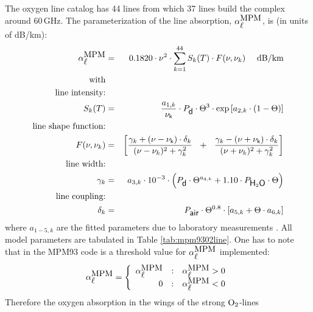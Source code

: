 {
\label{levele:mpm93_o2lines}
The oxygen line catalog has 44 lines from which 37 lines build the 
complex around 60\,GHz. The parameterization of the line absorption,
$\alpha^{\mbox{\rm MPM}}_{\mbox{$\ell$}}$, is (in units of dB/km):
\begin{eqnarray}
  \alphampml & = & 0.1820 \cdot \nu^2 \cdot  
                   \sum_{k=1}^{44}{S_k(T) \cdot F(\nu,\nu_k)}~~~~\mbox{dB/km}\\
%
 \mbox{with} &   &\nonumber\\
%
 \mbox{line intensity:} & & \nonumber\\
      S_k(T) & = & \frac{a_{1,k}}{\nuk} \cdot \pda \cdot \Theta^3 \cdot 
                   \exp{[a_{2,k} \cdot (1-\Theta)]}\nonumber\\
 \mbox{line shape function:} & & \nonumber\\
 F(\nu,\nu_k) & = & \left[\frac{\gamma_k+(\nu-\nuk)\cdot \delta_k}
                               {(\nu-\nu_k)^2+\gamma_k^2}~~+~~
                          \frac{\gamma_k-(\nu+\nuk)\cdot \delta_k}
                               {(\nu+\nu_k)^2+\gamma_k^2}\right] \nonumber\\
 \mbox{line width:} & & \nonumber\\
    \gamma_k & = & a_{3,k} \cdot 10^{-3} \cdot 
                 \left( \pda  \cdot \Theta^{a_{4,k}} + 
                        1.10 \cdot \phzo \cdot \Theta \right) \nonumber\\
 \mbox{line coupling:} & & \nonumber\\
         \delta_k & = & \pdair \cdot \Theta^{0.8} \cdot 
                   \left[ a_{5,k} + \Theta \cdot a_{6,k} \right]\nonumber\\
\end{eqnarray}
%
where $a_{1-5,k}$ are the fitted parameters due to laboratory measurements 
\cite{liebeetal:92}. All model parameters are tabulated in 
Table \ref{tab:mpm9302line}. One has to note that in the MPM93 code is a 
threshold value for $\alpha^{\mbox{\rm MPM}}_{\mbox{$\ell$}}$ implemented:
\begin{equation}
 \label{eq:mpm93O2limit}
  \alphampml = 
   \left \{ \begin{array}{r@{\quad:\quad}l} 
    \alphampml & \alphampml > 0\\
    0          & \alphampml < 0
                       \end{array} \right.
\end{equation}
Therefore the oxygen absorption in the wings of the strong $\mbox{O}_2$-lines 
}

